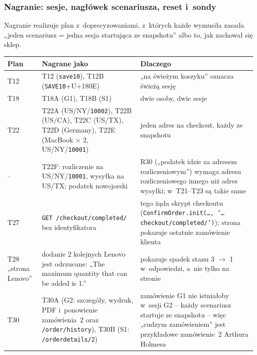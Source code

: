 
\subsubsection{Nagranie: sesje, nagłówek scenariusza, reset i~sondy}\label{sec:bench-ruch-nagranie}

Nagranie realizuje plan z~doprecyzowaniami, z~których każde wymusiła zasada „jeden
scenariusz = jedna sesja startująca ze snapshotu” albo to, jak zachował się sklep.

\begin{center}
\small
\begin{tabularx}{\linewidth}{@{}>{\raggedright\arraybackslash}p{2.3cm} >{\raggedright\arraybackslash}X >{\raggedright\arraybackslash}X@{}}
\toprule
Plan & Nagrane jako & Dlaczego \\
\midrule
T12 & T12 (\texttt{\textvisiblespace{}save10\textvisiblespace{}}), T12B (\texttt{SAVE10}+U+180E) & „na świeżym koszyku”
  oznacza świeżą sesję \\
T18 & T18A (G1), T18B (S1) & dwie osoby, dwie sesje \\
T22 & T22A (US/NY/\texttt{10002}), T22B (US/CA), T22C (US/TX), T22D (Germany), T22E
  (MacBook × 2, US/NY/\texttt{10001}) & jeden adres na checkout, każdy ze snapshotu \\
-- & T22F: rozliczenie na US/NY/\texttt{10001}, wysyłka na US/TX; podatek nowojorski &
  R30 („podatek idzie za adresem rozliczeniowym”) wymaga adresu rozliczeniowego innego niż
  adres wysyłki; w~T21--T23 są takie same \\
T27 & \texttt{GET /checkout/completed/} bez identyfikatora & tego żąda skrypt checkoutu
  (\texttt{ConfirmOrder.init(…, '…checkout/completed/')}); strona pokazuje ostatnie
  zamówienie klienta \\
T28 „strona Lenovo” & dodanie 2 kolejnych Lenovo jest odrzucane: „The maximum quantity
  that can be added is 1.” & pokazuje spadek stanu 3 $\rightarrow$ 1 w~odpowiedzi, a~nie
  tylko na stronie \\
T30 & T30A (G2: szczegóły, wydruk, PDF i~ponowienie zamówienia~2 oraz
  \texttt{/order/history}), T30B (S1: \texttt{/orderdetails/2}) & zamówienie G1 nie
  istniałoby w~sesji G2 -- każdy scenariusz startuje ze snapshotu -- więc „cudzym
  zamówieniem” jest przykładowe zamówienie~2 Arthura Holmesa \\
\bottomrule
\end{tabularx}
\end{center}

